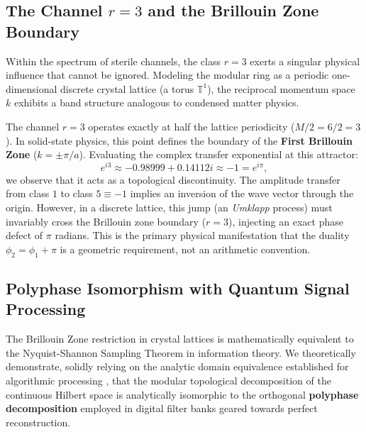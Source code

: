 \documentclass[12pt,a4paper]{article}
\theoremstyle{plain}
\theoremstyle{definition}
\theoremstyle{remark}
\begin{document}
\subsection{The Channel $r=3$ and the Brillouin Zone Boundary}

Within the spectrum of sterile channels, the class $r=3$ exerts a singular physical influence that cannot be ignored. Modeling the modular ring as a periodic one-dimensional discrete crystal lattice (a torus $\mathbb{T}^1$), the reciprocal momentum space $k$ exhibits a band structure analogous to condensed matter physics.

The channel $r=3$ operates exactly at half the lattice periodicity ($M/2 = 6/2 = 3$). In solid-state physics, this point defines the boundary of the \textbf{First Brillouin Zone} ($k = \pm \pi/a$). Evaluating the complex transfer exponential at this attractor:
\begin{equation}
e^{i3} \approx -0.98999 + 0.14112i \approx -1 = e^{i\pi},
\end{equation}
we observe that it acts as a topological discontinuity. The amplitude transfer from class $1$ to class $5 \equiv -1$ implies an inversion of the wave vector through the origin. However, in a discrete lattice, this jump (an \textit{Umklapp} process) must invariably cross the Brillouin zone boundary ($r=3$), injecting an exact phase defect of $\pi$ radians. This is the primary physical manifestation that the duality $\phi_2 = \phi_1 + \pi$ is a geometric requirement, not an arithmetic convention.

\subsection{Polyphase Isomorphism with Quantum Signal Processing}

The Brillouin Zone restriction in crystal lattices is mathematically equivalent to the Nyquist-Shannon Sampling Theorem in information theory. We theoretically demonstrate, solidly relying on the analytic domain equivalence established for algorithmic processing \cite{Peinador_Isomorfismo_DSP_2025}, that the modular topological decomposition of the continuous Hilbert space is analytically isomorphic to the orthogonal \textbf{polyphase decomposition} employed in digital filter banks geared towards perfect reconstruction.
\end{document}
